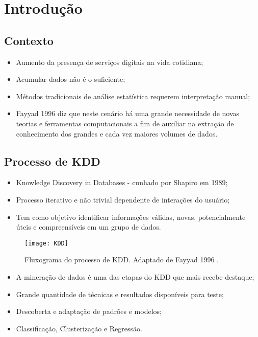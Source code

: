 \section{Introdução}

\subsection{Contexto}
\begin{frame}
	\begin{itemize}
		\item Aumento da presença de serviços digitais na vida cotidiana;
		\item Acumular dados não é o suficiente;
		\item Métodos tradicionais de análise estatística requerem interpretação manual;
		\item Fayyad 1996 \cite{fayyad1996} diz que neste cenário há uma grande necessidade de novas teorias e ferramentas computacionais a fim de auxiliar na extração de conhecimento dos grandes e cada vez maiores volumes de dados.
	\end{itemize}
\end{frame}

\subsection{Processo de KDD}

\begin{frame}
	\begin{itemize}
		\item Knowledge Discovery in Databases - cunhado por Shapiro em 1989;
		\item Processo iterativo e não trivial dependente de interações do usuário;
		\item Tem como objetivo identificar informações válidas, novas, potencialmente úteis e compreensíveis em um grupo de dados.
	\end{itemize}
\end{frame}

\begin{frame}
	\begin{figure}[h!]
		\texttt{[image: KDD]}
		\caption{Fluxograma do processo de KDD. Adaptado de Fayyad 1996 \cite{fayyad1996}.}
	\end{figure}
\end{frame}

\begin{frame}
	\begin{itemize}
		\item A mineração de dados é uma das etapas do KDD que mais recebe destaque;
		\item Grande quantidade de técnicas e resultados disponíveis para teste;
		\item Descoberta e adaptação de padrões e modelos;
		\item Classificação, Clusterização e Regressão.
	\end{itemize}
\end{frame}
